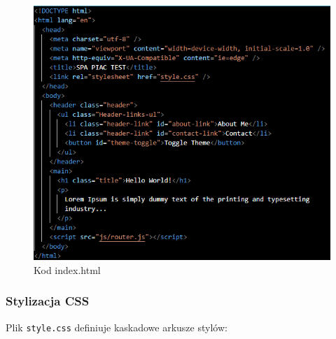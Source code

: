 \documentclass[a4paper,12pt]{article}
\begin{document}
\begin{figure}[H]
    \centering
    \includegraphics[width=1\textwidth]{images/index_html.png}
    \caption{Kod index.html}
\end{figure}

\subsubsection{Stylizacja CSS}
Plik \texttt{style.css} definiuje kaskadowe arkusze stylów:
\end{document}
